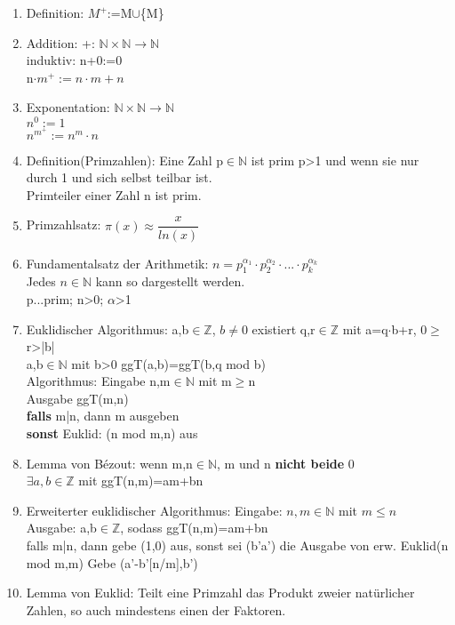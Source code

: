 \documentclass{scrartcl}
\begin{document}
\begin{enumerate}
    \item Definition: $M^+$:=M$\cup$\{M\}
    \item Addition: +: $\mathbb{N}\times\mathbb{N}\rightarrow\mathbb{N}$\\
    induktiv: n+0:=0\\
    n$\cdot m^+:=n\cdot m+n$\\
    \item Exponentation: $\mathbb{N}\times \mathbb{N}\rightarrow\mathbb{N}$\\
    $n^0:=1$\\
    $n^{m^{+}}:=n^m\cdot n$
    \item Definition(Primzahlen): Eine Zahl p$\in \mathbb{N}$ ist prim p>1 und wenn sie nur durch 1 und sich selbst teilbar ist.\\
    Primteiler einer Zahl n ist prim.
    \item Primzahlsatz: $\pi (x)\approx \dfrac{x}{ln(x)}$
    \item Fundamentalsatz der Arithmetik: $n=p_{1}^{\alpha_1}\cdot p_{2}^{\alpha_2}\cdot ...\cdot p_{k}^{\alpha_k}$\\
    Jedes $n\in\mathbb{N}$ kann so dargestellt werden.\\
    p...prim; n>0; $\alpha$>1\\
    \item Euklidischer Algorithmus: a,b$\in \mathbb{Z}$, $b\neq 0$ existiert q,r$\in\mathbb{Z}$ mit a=q$\cdot$b+r, 0$\geq$r>|b|\\
    a,b$\in \mathbb{N}$ mit b>0 ggT(a,b)=ggT(b,q mod b)\\
    Algorithmus: Eingabe n,m$\in \mathbb{N}$ mit m$\geq$n\\
    Ausgabe ggT(m,n)\\
    \textbf{falls} m|n, dann m ausgeben\\
    \textbf{sonst} Euklid: (n mod m,n) aus
    \item Lemma von Bézout: wenn m,n$\in\mathbb{N}$, m und n \textbf{nicht beide} 0\\
    $\exists a,b \in \mathbb{Z}$ mit ggT(n,m)=am+bn
    \item Erweiterter euklidischer Algorithmus: Eingabe: $n,m \in \mathbb{N}$ mit $m\leq n$\\
    Ausgabe: a,b$\in \mathbb{Z}$, sodass ggT(n,m)=am+bn\\
    falls m|n, dann gebe (1,0) aus, sonst sei (b'a') die Ausgabe von erw. Euklid(n mod m,m) Gebe (a'-b'[n/m],b')
    \item Lemma von Euklid: Teilt eine Primzahl das Produkt zweier natürlicher Zahlen, so auch mindestens einen der Faktoren.

\end{enumerate}
\end{document}
